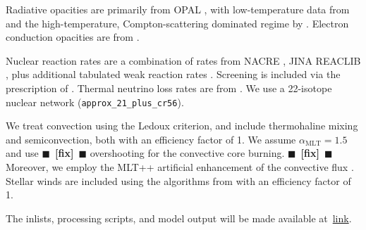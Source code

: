 \documentclass[twocolumn,twocolappendix,trackchanges]{aastex63}
\newcommand{\todo}[1]{{\large $\blacksquare$~\textbf{\color{red}[#1]}}~$\blacksquare$}
\begin{document}
Radiative opacities are primarily from OPAL \citep{Iglesias1993,
  Iglesias1996}, with low-temperature data from \citet{Ferguson2005}
and the high-temperature, Compton-scattering dominated regime by
\citet{Buchler1976}. Electron conduction opacities are from
\citet{Cassisi2007}.

Nuclear reaction rates are a combination of rates from NACRE
\citep{Angulo1999}, JINA REACLIB \citep{Cyburt2010}, plus additional
tabulated weak reaction rates \citet{Fuller1985, Oda1994,
  Langanke2000}. Screening is included via the prescription of
\citet{Chugunov2007}.  Thermal neutrino loss rates are from
\citet{Itoh1996}. We use a
22-isotope nuclear network (\texttt{approx\_21\_plus\_cr56}).

We treat convection using the Ledoux criterion, and include
thermohaline mixing and semiconvection, both with an efficiency factor
of 1. We assume $\alpha_\mathrm{MLT}=1.5$ and use \todo{fix}
\cite{brott:11} overshooting for the convective core
burning. \todo{fix} Moreover, we employ the MLT++ artificial
enhancement of the convective flux \citep[e.g.,][]{paxton:15}. Stellar
winds are included using the algorithms from \cite{vink:01} with an
efficiency factor of
1.%

The inlists, processing scripts, and model output will be made available at~\href{link}{link}.



\end{document}

